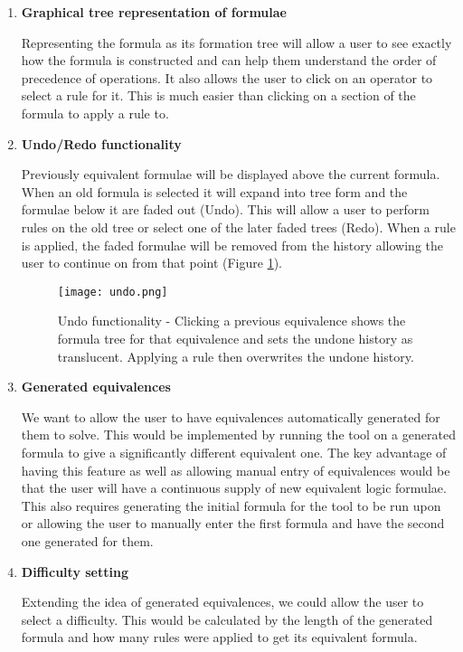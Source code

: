 \documentclass[draft]{report}
\begin{document}
\begin{enumerate}
\item \textbf{Graphical tree representation of formulae}

Representing the formula as its formation tree will allow a user to see exactly how the formula is constructed and can help them understand the order of precedence of operations. It also allows the user to click on an operator to select a rule for it. This is much easier than clicking on a section of the formula to apply a rule to.

\item \textbf{Undo/Redo functionality}

Previously equivalent formulae will be displayed above the current formula. When an old formula is selected it will expand into tree form and the formulae below it are faded out (Undo). This will allow a user to perform rules on the old tree or select one of the later faded trees (Redo). When a rule is applied, the faded formulae will be removed from the history allowing the user to continue on from that point (Figure \ref{undo}).

\begin{figure}[ht]
    \centering
    \texttt{[image: undo.png]}
    \caption{Undo functionality - Clicking a previous equivalence shows the formula tree for that equivalence and sets the undone history as translucent. Applying a rule then overwrites the undone history.}
    \label{undo}
\end{figure}

\item \textbf{Generated equivalences}

We want to allow the user to have equivalences automatically generated for them to solve. This would be implemented by running the tool on a generated formula to give a significantly different equivalent one. The key advantage of having this feature as well as allowing manual entry of equivalences would be that the user will have a continuous supply of new equivalent logic formulae. This also requires generating the initial formula for the tool to be run upon or allowing the user to manually enter the first formula and have the second one generated for them.

\item \textbf{Difficulty setting}

Extending the idea of generated equivalences, we could allow the user to select a difficulty. This would be calculated by the length of the generated formula and how many rules were applied to get its equivalent formula.


\end{enumerate}
\end{document}
